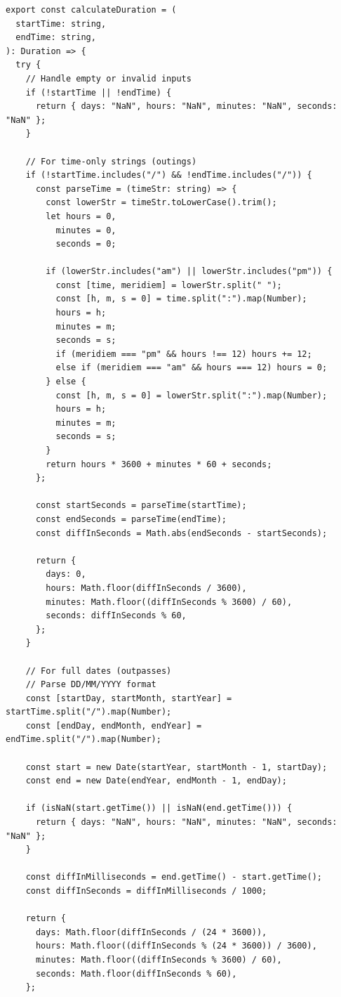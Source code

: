 \documentclass[11pt,a4paper,oneside]{article}
\begin{document}
\begin{lstlisting}
export const calculateDuration = (
  startTime: string,
  endTime: string,
): Duration => {
  try {
    // Handle empty or invalid inputs
    if (!startTime || !endTime) {
      return { days: "NaN", hours: "NaN", minutes: "NaN", seconds: "NaN" };
    }

    // For time-only strings (outings)
    if (!startTime.includes("/") && !endTime.includes("/")) {
      const parseTime = (timeStr: string) => {
        const lowerStr = timeStr.toLowerCase().trim();
        let hours = 0,
          minutes = 0,
          seconds = 0;

        if (lowerStr.includes("am") || lowerStr.includes("pm")) {
          const [time, meridiem] = lowerStr.split(" ");
          const [h, m, s = 0] = time.split(":").map(Number);
          hours = h;
          minutes = m;
          seconds = s;
          if (meridiem === "pm" && hours !== 12) hours += 12;
          else if (meridiem === "am" && hours === 12) hours = 0;
        } else {
          const [h, m, s = 0] = lowerStr.split(":").map(Number);
          hours = h;
          minutes = m;
          seconds = s;
        }
        return hours * 3600 + minutes * 60 + seconds;
      };

      const startSeconds = parseTime(startTime);
      const endSeconds = parseTime(endTime);
      const diffInSeconds = Math.abs(endSeconds - startSeconds);

      return {
        days: 0,
        hours: Math.floor(diffInSeconds / 3600),
        minutes: Math.floor((diffInSeconds % 3600) / 60),
        seconds: diffInSeconds % 60,
      };
    }

    // For full dates (outpasses)
    // Parse DD/MM/YYYY format
    const [startDay, startMonth, startYear] = startTime.split("/").map(Number);
    const [endDay, endMonth, endYear] = endTime.split("/").map(Number);

    const start = new Date(startYear, startMonth - 1, startDay);
    const end = new Date(endYear, endMonth - 1, endDay);

    if (isNaN(start.getTime()) || isNaN(end.getTime())) {
      return { days: "NaN", hours: "NaN", minutes: "NaN", seconds: "NaN" };
    }

    const diffInMilliseconds = end.getTime() - start.getTime();
    const diffInSeconds = diffInMilliseconds / 1000;

    return {
      days: Math.floor(diffInSeconds / (24 * 3600)),
      hours: Math.floor((diffInSeconds % (24 * 3600)) / 3600),
      minutes: Math.floor((diffInSeconds % 3600) / 60),
      seconds: Math.floor(diffInSeconds % 60),
    };

\end{lstlisting}
\end{document}
